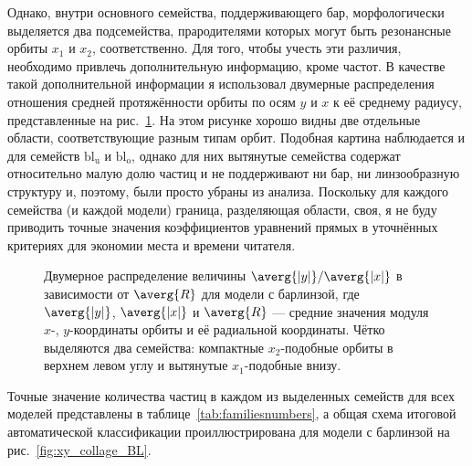 \documentclass[tikz]{trlnotes}
\begin{document}
Однако, внутри основного семейства, поддерживающего бар, морфологически выделяется два подсемейства,
прародителями которых могут быть резонансные орбиты $x_1$ и $x_2$, соответственно. Для того, чтобы учесть
эти различия, необходимо привлечь дополнительную информацию, кроме частот.
В качестве такой дополнительной информации я использовал двумерные распределения отношения средней протяжённости
орбиты по осям $y$ и $x$ к её среднему радиусу, представленные на рис.~\ref{fig:x1x2sep}. На этом рисунке хорошо видны две отдельные области, соответствующие разным типам орбит. Подобная картина наблюдается и для семейств
$\text{bl}_\text{u}$ и $\text{bl}_\text{o}$, однако для них вытянутые семейства содержат относительно малую долю частиц и не поддерживают ни бар, ни линзообразную структуру и, поэтому, были просто убраны из анализа. 
Поскольку для каждого семейства (и каждой модели) граница, разделяющая области, своя, я не буду приводить точные значения коэффициентов уравнений прямых в
уточнённых критериях для экономии места и времени читателя.  

\begin{figure}[htpb]
  \centering
\caption{Двумерное распределение величины $\averg{|y|}/\averg{|x|}$ в зависимости от $\averg{R}$ для модели с барлинзой, где $\averg{|y|}$, $\averg{|x|}$ и  $\averg{R}$ --- средние значения модуля $x$-, $y$-координаты орбиты и её радиальной координаты. Чётко выделяются
два семейства: компактные $x_2$-подобные орбиты в верхнем левом углу и вытянутые $x_1$-подобные внизу.}%
\label{fig:x1x2sep}
\end{figure}

Точные значение количества частиц в каждом из выделенных семейств для всех моделей представлены в таблице~\ref{tab:familiesnumbers},
а общая схема итоговой автоматической классификации проиллюстрирована для модели с барлинзой на рис.~\ref{fig:xy_collage_BL}.
\end{document}
